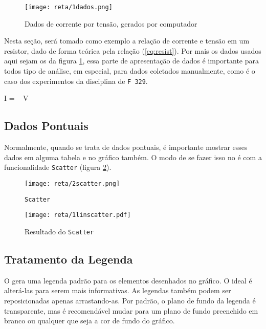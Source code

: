 \begin{figure}[htbp]
    \centering
    \texttt{[image: reta/1dados.png]}

    \caption{Dados de corrente por tensão, gerados por computador}
    \label{fig:reta:dados}
\end{figure}

Nesta seção, será tomado como exemplo a relação de corrente e tensão em um resistor, dado de forma teórica pela relação (\ref{eq:resist}). Por mais os dados usados aqui sejam os da figura \ref{fig:reta:dados}, essa parte de apresentação de dados é importante para todos tipo de análise, em especial, para dados coletados manualmente, como é o caso dos experimentos da disciplina de \texttt{F 329}.

\begin{equacao} \label{eq:resist}
    I =  ~ V
\end{equacao}


\subsection{Dados Pontuais}

    Normalmente, quando se trata de dados pontuais, é importante mostrar esses dados em alguma tabela e no gráfico também. O modo de se fazer isso no \software é com a funcionalidade \texttt{Scatter} (figura \ref{fig:reta:scatter}).

    \begin{figure}[htbp]
        \centering
        \texttt{[image: reta/2scatter.png]}

        \caption{\texttt{Scatter}}
        \label{fig:reta:scatter}
    \end{figure}

    \begin{figure}[htbp]
        \centering
        \texttt{[image: reta/1linscatter.pdf]}

        \caption{Resultado do \texttt{Scatter}}
        \label{fig:reta:linscatter}
    \end{figure}


\subsection{Tratamento da Legenda}

    O \software gera uma legenda padrão para os elementos desenhados no gráfico. O ideal é alterá-las para serem mais informativas. As legendas também podem ser reposicionadas apenas arrastando-as. Por padrão, o plano de fundo da legenda é transparente, mas é recomendável mudar para um plano de fundo preenchido em branco ou qualquer que seja a cor de fundo do gráfico.

